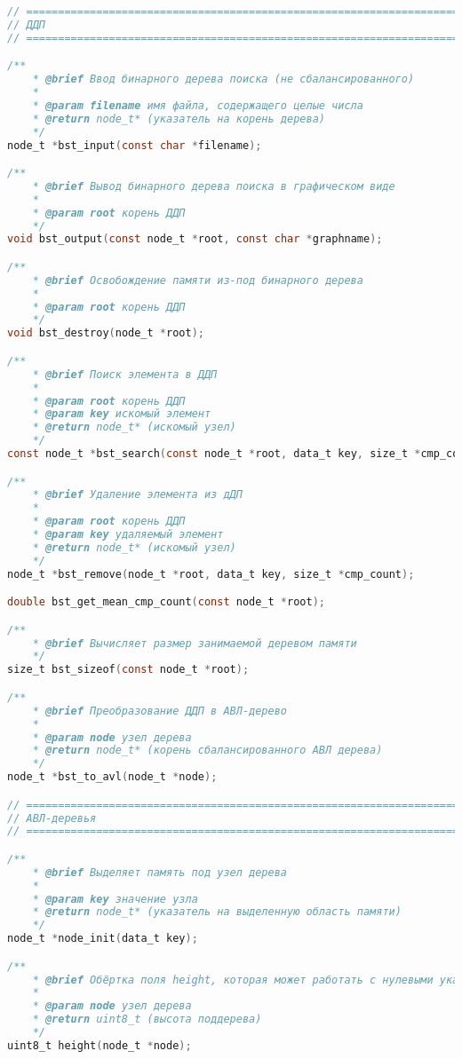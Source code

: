 \begin{lstlisting}[language=C,caption=Функции для работы с деревьями,label=func:trees]
// ================================================================================
// ДДП
// ================================================================================

/**
    * @brief Ввод бинарного дерева поиска (не сбалансированного)
    * 
    * @param filename имя файла, содержащего целые числа
    * @return node_t* (указатель на корень дерева)
    */
node_t *bst_input(const char *filename);

/**
    * @brief Вывод бинарного дерева поиска в графическом виде
    * 
    * @param root корень ДДП
    */
void bst_output(const node_t *root, const char *graphname);

/**
    * @brief Освобождение памяти из-под бинарного дерева
    * 
    * @param root корень ДДП 
    */
void bst_destroy(node_t *root);

/**
    * @brief Поиск элемента в ДДП
    * 
    * @param root корень ДДП
    * @param key искомый элемент
    * @return node_t* (искомый узел)
    */
const node_t *bst_search(const node_t *root, data_t key, size_t *cmp_count);

/**
    * @brief Удаление элемента из дДП
    * 
    * @param root корень ДДП
    * @param key удаляемый элемент
    * @return node_t* (искомый узел)
    */
node_t *bst_remove(node_t *root, data_t key, size_t *cmp_count);

double bst_get_mean_cmp_count(const node_t *root);

/**
    * @brief Вычисляет размер занимаемой деревом памяти
    */
size_t bst_sizeof(const node_t *root);

/**
    * @brief Преобразование ДДП в АВЛ-дерево
    * 
    * @param node узел дерева
    * @return node_t* (корень сбалансированного АВЛ дерева)
    */
node_t *bst_to_avl(node_t *node);

// ====================================================================================
// АВЛ-деревья
// ====================================================================================

/**
    * @brief Выделяет память под узел дерева
    * 
    * @param key значение узла
    * @return node_t* (указатель на выделенную область памяти)
    */
node_t *node_init(data_t key);

/**
    * @brief Обёртка поля height, которая может работать с нулевыми указателями
    * 
    * @param node узел дерева
    * @return uint8_t (высота поддерева)
    */
uint8_t height(node_t *node);


\end{lstlisting}
